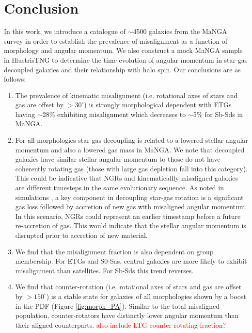 \documentclass[fleqn,usenatbib]{mnras}
\newcommand{\red}[1]{{\textcolor{red}{#1}}}
\begin{document}
\section{Conclusion} \label{sec:conclusion}
In this work, we introduce a catalogue of $\sim$4500 galaxies from the MaNGA survey in order to establish the prevalence of misalignment as a function of morphology and angular momentum. We also construct a mock MaNGA sample in IllustrisTNG to determine the time evolution of angular momentum in star-gas decoupled galaxies and their relationship with halo spin. Our conclusions are as follows:
\begin{enumerate}
    \item The prevalence of kinematic misalignment (i.e. rotational axes of stars and gas are offset by $> 30^{\circ}$) is strongly morphological dependent with ETGs having $\sim$28\% exhibiting misalignment which decreases to $\sim$5\% for Sb-Sds in MaNGA.
    
    \item For all morphologies star-gas decoupling is related to a lowered stellar angular momentum and also a lowered gas mass in MaNGA. We note that decoupled galaxies have similar stellar angular momentum to those do not have coherently rotating gas (those with large gas depletion fall into this category). This could be indicative that NGRs and kinematicallly misaligned galaxies are different timesteps in the same evolutionary sequence. As noted in simulations \citep[][]{vdvoort2015, starkenburg+19}, a key component in decoupling star-gas rotation is a significant gas loss followed by accretion of new gas with misaligned angular momentum. In this scenario, NGRs could represent an earlier timestamp before a future re-accretion of gas. This would indicate that the stellar angular momentum is disrupted prior to accretion of new material. 
    
    \item We find that the misalignment fraction is also dependent on group membership. For ETGs and S0-Sas, central galaxies are more likely to exhibit misalignment than satellites. For Sb-Sds this trend reverses.
    
    \item We find that counter-rotation (i.e. rotational axes of stars and gas are offset by $> 150^{\circ}$) is a stable state for galaxies of all morphologies shown by a boost in the PDF (Figure \ref{fig:morph_PA}). Similar to the total misaligned population, counter-rotators have distinctly lower angular momentum than their aligned counterparts. \red{also include LTG counter-rotating fraction?}
    

\end{enumerate}
\end{document}
